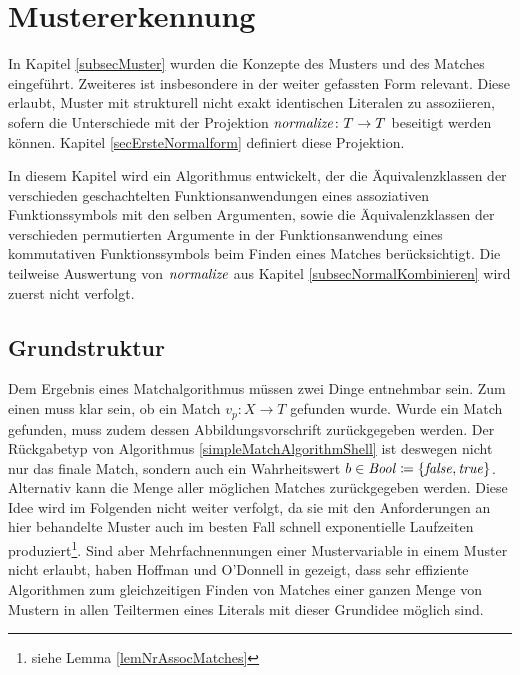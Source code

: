 

\chapter{Mustererkennung} \label{secPattermatching}

In Kapitel \ref{subsecMuster} wurden die Konzepte des Musters und des Matches eingeführt. Zweiteres ist insbesondere in der weiter gefassten Form relevant. Diese erlaubt, Muster mit strukturell nicht exakt identischen Literalen zu assoziieren, sofern die Unterschiede mit der Projektion $\mathit{normalize} \colon T \rightarrow T$ beseitigt werden können. 
Kapitel \ref{secErsteNormalform} definiert diese Projektion.

In diesem Kapitel wird ein Algorithmus entwickelt, der die Äquivalenzklassen der verschieden geschachtelten Funktionsanwendungen eines assoziativen Funktionssymbols mit den selben Argumenten, sowie die Äquivalenzklassen der verschieden permutierten Argumente in der Funktionsanwendung eines kommutativen Funktionssymbols beim Finden eines Matches berücksichtigt. Die teilweise Auswertung von $\mathit{normalize}$ aus Kapitel \ref{subsecNormalKombinieren} wird zuerst nicht verfolgt.


\section{Grundstruktur} \label{subsecPatternmatchingGrundstruktur}

Dem Ergebnis eines Matchalgorithmus müssen zwei Dinge entnehmbar sein. Zum einen muss klar sein, ob ein Match $v_p \colon X \rightarrow T$ gefunden wurde. Wurde ein Match gefunden, muss zudem dessen Abbildungsvorschrift zurückgegeben werden. Der Rückgabetyp von Algorithmus \ref{simpleMatchAlgorithmShell} ist deswegen nicht nur das finale Match, sondern auch ein Wahrheitswert $b \in \mathit{Bool} \coloneqq \{\mathit{false}, \mathit{true}\}$. Alternativ kann die Menge aller möglichen Matches zurückgegeben werden. Diese Idee wird im Folgenden nicht weiter verfolgt, da sie mit den Anforderungen an hier behandelte Muster auch im besten Fall schnell exponentielle Laufzeiten produziert\footnote{siehe Lemma \ref{lemNrAssocMatches}}. Sind aber Mehrfachnennungen einer Mustervariable in einem Muster nicht erlaubt, haben Hoffman und O'Donnell in \cite{patternMatchingInTrees} gezeigt, dass sehr effiziente Algorithmen zum gleichzeitigen Finden von Matches einer ganzen Menge von Mustern in allen Teiltermen eines Literals mit dieser Grundidee möglich sind.\\

